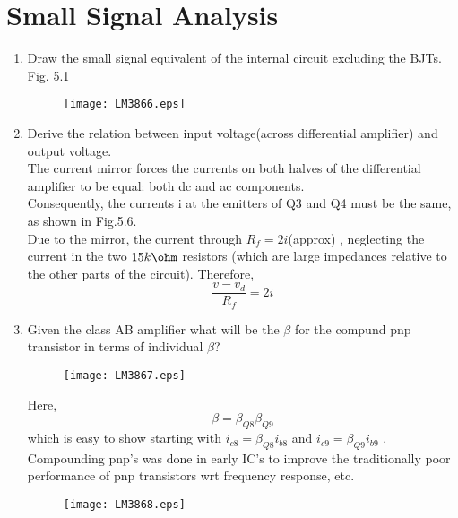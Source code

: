 \documentclass[journal,12pt,twocolumn]{IEEEtran}
\renewcommand\thesection{\arabic{section}}
\begin{document}
\section{Small Signal Analysis}
\begin{enumerate}[label=\thesection.\arabic*,ref=\thesection.\theenumi]
\item Draw the small signal equivalent of the internal circuit excluding the BJTs.\\

\solution Fig. 5.1

\begin{figure}[!ht]
\centering
\texttt{[image: LM3866.eps]}
\caption{}
\label{fig:2}
\end{figure}

\item Derive the relation between input voltage(across differential amplifier) and output voltage.\\
\solution
The current mirror forces the currents on both halves of the
differential amplifier to be equal: both dc and ac components.\\
Consequently, the currents i at the emitters of Q3 and Q4 must
be the same, as shown in Fig.5.6.\\ Due to the mirror, the current through $R_{f} = 2 i$(approx) , neglecting the current in the two $15k\ohm$ resistors (which are large impedances
relative to the other parts of the circuit). Therefore,\\
$$\frac{v-v_{d}}{R_{f}}=2i$$   

\item Given the class AB amplifier what will be the $\beta$ for the compund pnp transistor in terms of individual $\beta$?

\begin{figure}[!ht]
  \centering
 
    \texttt{[image: LM3867.eps]}

\caption{}
\label{fig:1}
\end{figure}
\solution
Here,
$$\beta = \beta_{Q8} \beta_{Q9}$$  which is easy to show starting with
$i_{c8}=\beta_{Q8}i_{b8}$ and $i_{c9}=\beta_{Q9}i_{b9}$ . Compounding pnp’s was done in
early IC’s to improve the traditionally poor performance of pnp
transistors wrt frequency response, etc. 


\begin{figure}[!ht]
  \centering
 
    \texttt{[image: LM3868.eps]}

\caption{}
\label{fig:1}
\end{figure}
\end{enumerate}
\end{document}
